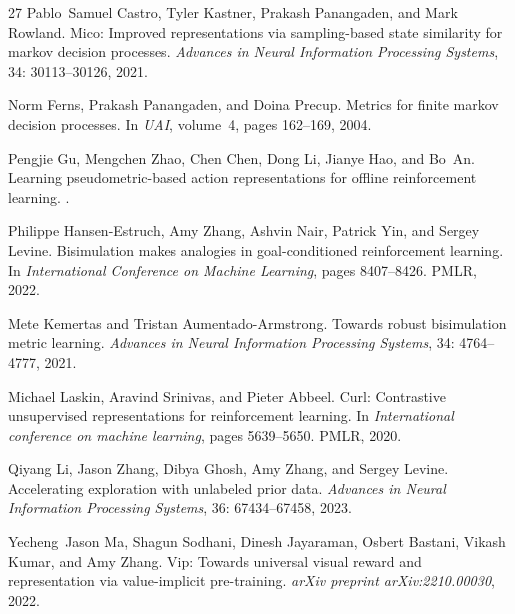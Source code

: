 \documentclass{article}
\begin{document}
\begin{thebibliography}{27}
Pablo~Samuel Castro, Tyler Kastner, Prakash Panangaden, and Mark Rowland.
\newblock Mico: Improved representations via sampling-based state similarity for markov decision processes.
\newblock \emph{Advances in Neural Information Processing Systems}, 34: 30113--30126, 2021.

Norm Ferns, Prakash Panangaden, and Doina Precup.
\newblock Metrics for finite markov decision processes.
\newblock In \emph{UAI}, volume~4, pages 162--169, 2004.

Pengjie Gu, Mengchen Zhao, Chen Chen, Dong Li, Jianye Hao, and Bo~An.
\newblock Learning pseudometric-based action representations for offline reinforcement learning.
.

Philippe Hansen-Estruch, Amy Zhang, Ashvin Nair, Patrick Yin, and Sergey Levine.
\newblock Bisimulation makes analogies in goal-conditioned reinforcement learning.
\newblock In \emph{International Conference on Machine Learning}, pages 8407--8426. PMLR, 2022.

Mete Kemertas and Tristan Aumentado-Armstrong.
\newblock Towards robust bisimulation metric learning.
\newblock \emph{Advances in Neural Information Processing Systems}, 34: 4764--4777, 2021.

Michael Laskin, Aravind Srinivas, and Pieter Abbeel.
\newblock Curl: Contrastive unsupervised representations for reinforcement learning.
\newblock In \emph{International conference on machine learning}, pages 5639--5650. PMLR, 2020.

Qiyang Li, Jason Zhang, Dibya Ghosh, Amy Zhang, and Sergey Levine.
\newblock Accelerating exploration with unlabeled prior data.
\newblock \emph{Advances in Neural Information Processing Systems}, 36: 67434--67458, 2023.

Yecheng~Jason Ma, Shagun Sodhani, Dinesh Jayaraman, Osbert Bastani, Vikash Kumar, and Amy Zhang.
\newblock Vip: Towards universal visual reward and representation via value-implicit pre-training.
\newblock \emph{arXiv preprint arXiv:2210.00030}, 2022.


\end{thebibliography}
\end{document}
